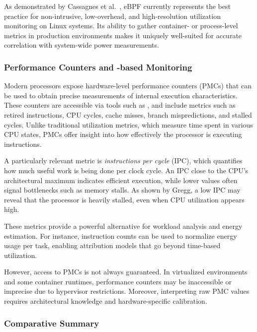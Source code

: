 As demonstrated by Cassagnes et al.~\parencite{cassagnesRiseEBPFNonintrusive2020}, eBPF currently represents the best practice for non-intrusive, low-overhead, and high-resolution utilization monitoring on Linux systems. Its ability to gather container- or process-level metrics in production environments makes it uniquely well-suited for accurate correlation with system-wide power measurements.

\subsubsection{Performance Counters and -based Monitoring}
\label{sec:perf_metrics}

Modern processors expose hardware-level performance counters (PMCs) that can be used to obtain precise measurements of internal execution characteristics. These counters are accessible via tools such as , and include metrics such as retired instructions, CPU cycles, cache misses, branch mispredictions, and stalled cycles. Unlike traditional utilization metrics, which measure time spent in various CPU states, PMCs offer insight into how effectively the processor is executing instructions.

A particularly relevant metric is \textit{instructions per cycle} (IPC), which quantifies how much useful work is being done per clock cycle. An IPC close to the CPU's architectural maximum indicates efficient execution, while lower values often signal bottlenecks such as memory stalls. As shown by Gregg\parencite{Gregg2017CpuUtilizationWrong}, a low IPC may reveal that the processor is heavily stalled, even when CPU utilization appears high.

These metrics provide a powerful alternative for workload analysis and energy estimation. For instance, instruction counts can be used to normalize energy usage per task, enabling attribution models that go beyond time-based utilization.

However, access to PMCs is not always guaranteed. In virtualized environments and some container runtimes, performance counters may be inaccessible or imprecise due to hypervisor restrictions. Moreover, interpreting raw PMC values requires architectural knowledge and hardware-specific calibration.

\subsubsection{Comparative Summary}

